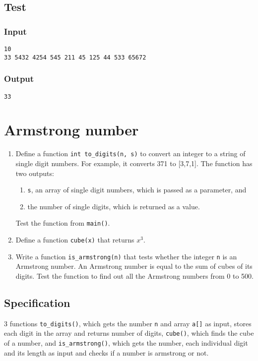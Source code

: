 \documentclass[11pt]{article}
\begin{document}
\subsection*{Test}
\label{sec-7-6}
\subsubsection*{Input}
\label{sec-7-6-1}
\begin{verbatim}
10
33 5432 4254 545 211 45 125 44 533 65672
\end{verbatim}
\subsubsection*{Output}
\label{sec-7-6-2}
\begin{verbatim}
33
\end{verbatim}

\section{Armstrong number}
\label{sec-8}
\begin{enumerate}
\item Define a function \texttt{int to\_digits(n, s)} to convert an integer
to a string of single digit numbers. For example, it converts
371 to [3,7,1]. The function has two outputs:
\begin{enumerate}
\item \texttt{s}, an array of single digit numbers, which is passed as a
parameter, and
\item the number of single digits, which is returned as a value.
\end{enumerate}
Test the function from \texttt{main()}.
\item Define a function \texttt{cube(x)} that returns $x^3$.
\item Write a function \texttt{is\_armstrong(n)} that tests whether the
integer \texttt{n} is an Armstrong number. An Armstrong number is
equal to the sum of cubes of its digits. Test the function to
find out all the Armstrong numbers from 0 to 500.
\end{enumerate}
\subsection*{Specification}
\label{sec-8-1}
3 functions \texttt{to\_digits()}, which gets the number \texttt{n} and array \texttt{a[]}
as input, stores each digit in the array and returns number of digits,
\texttt{cube()}, which finds the cube of a number, and \texttt{is\_armstrong()}, which
gets the number, each individual digit and its length as input and checks
if a number is armstrong or not.
\end{document}
